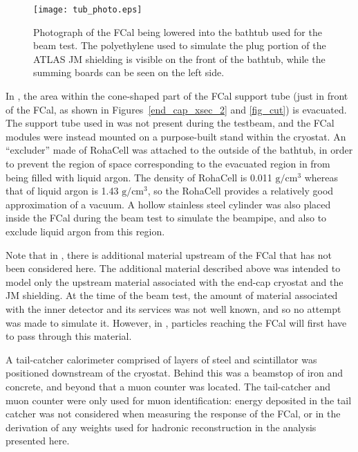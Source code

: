 \begin{figure}[tbp]
\begin{center}
\texttt{[image: tub\_photo.eps]}
\end{center}
\caption[Photograph of the FCal and bathtub prior to beam test]{Photograph of the  FCal being lowered into the bathtub used for the beam test. The polyethylene used to simulate the plug portion of the ATLAS JM shielding is visible on the front of the bathtub, while the summing boards can be seen on the left side.}
\label{tub_photo}
\end{figure}




In \atlas, the area within the cone-shaped part of the FCal support tube (just in front of the FCal, as shown in Figures~\ref{end_cap_xsec_2} and \ref{fig_cut}) is evacuated. The support tube used in \atlas was not present during the testbeam, and the FCal modules were instead mounted on a purpose-built stand within the cryostat. An ``excluder'' made of RohaCell was attached to the outside of the bathtub, in order to prevent the region of space corresponding to the evacuated region in \atlas from being filled with liquid argon. 
 The density of RohaCell is 0.011 $\mathrm{g}/\mathrm{cm}^3$ whereas that of liquid argon is 1.43 $\mathrm{g}/\mathrm{cm}^3$, so the RohaCell provides a relatively good approximation of a vacuum. A hollow stainless steel cylinder was also placed inside the FCal during the beam test to simulate the beampipe, and also to exclude liquid argon from this region.
 
Note that in \atlas, there is additional material upstream of the FCal that has not been considered here. The additional material described above was intended to model only the upstream material associated with the end-cap cryostat and the JM shielding. At the time of the beam test, the amount of material associated with the inner detector and its services was not well known, and so no attempt was made to simulate it. However, in \atlas, particles reaching the FCal will first have to pass through this material.

A tail-catcher calorimeter comprised of layers of steel and scintillator was positioned downstream of the cryostat. Behind this was a beamstop of iron and concrete, and beyond that a muon counter was located. The tail-catcher and muon counter were only used for muon identification: energy deposited in the tail catcher was not considered when measuring the response of the FCal, or in the derivation of any weights used for hadronic reconstruction in the analysis presented here.

